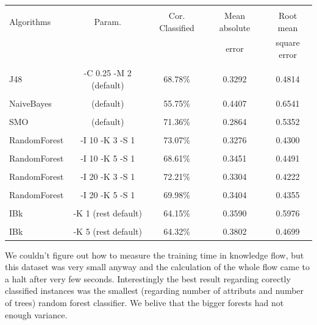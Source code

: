 \documentclass[a4paper]{article}
\begin{document}
\begin{table}
\begin{tabular}{|l| c | c | c | c |}
\hline & & & & \\
Algorithms & Param. & Cor. Classified & Mean absolute & Root mean \\
& & & error & square error\\
\hline & & & & \\
   J48 &-C 0.25 -M 2 (default) & 68.78\% & 0.3292 & 0.4814 \\
\hline & & & & \\
NaiveBayes & (default) & 55.75\% & 0.4407 & 0.6541 \\
\hline & & & & \\
       SMO & (default) & 71.36\% & 0.2864 & 0.5352 \\
\hline & & & & \\
    RandomForest & -I 10 -K 3 -S 1 & 73.07\% & 0.3276 & 0.4300 \\
\hline & & & & \\
    RandomForest & -I 10 -K 5 -S 1 & 68.61\% & 0.3451 & 0.4491 \\
\hline & & & & \\
    RandomForest & -I 20 -K 3 -S 1 & 72.21\% & 0.3304 & 0.4222 \\
\hline & & & & \\
    RandomForest & -I 20 -K 5 -S 1 & 69.98\% & 0.3404 & 0.4355 \\
\hline & & & & \\
    IBk          & -K 1 (rest default) & 64.15\% & 0.3590 & 0.5976 \\
\hline & & & & \\
    IBk          & -K 5 (rest default) & 64.32\% & 0.3802 & 0.4699 \\
\hline 
\end{tabular}
\end{table}
We couldn't figure out how to measure the training time in knowledge flow, but
this dataset was very small anyway and the calculation of the whole flow came to a halt after very
few seconds. Interestingly the best result regarding corectly classified
instances was the smallest (regarding number of attributs and number of trees)
random forest classifier. We belive that the bigger forests had not enough
variance. 
\end{document}
